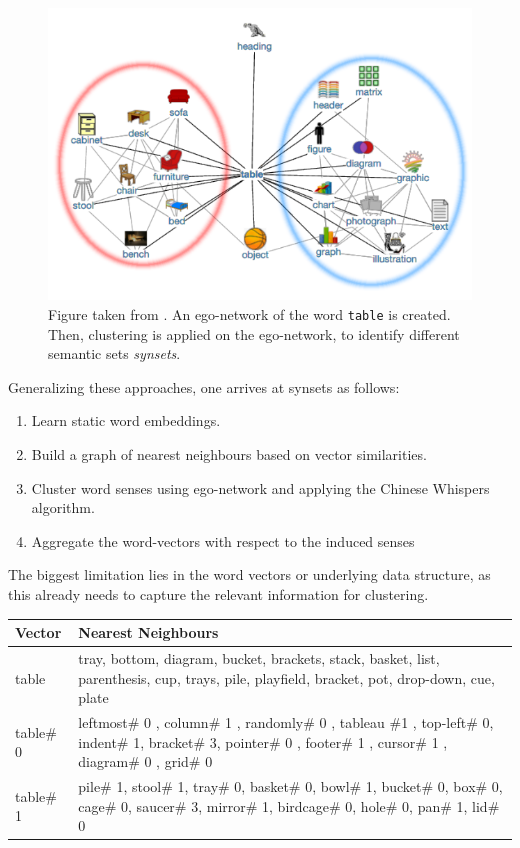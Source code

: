 \documentclass[a4paper,12pt,oneside,openright]{report}
\begin{document}
\begin{figure}[h]
	\center
  \includegraphics[width=0.6\linewidth]{./assets/relatedwork/ego_network.png}
  \caption{Figure taken from \cite{pelevina16}. An ego-network of the word \texttt{table} is created. Then, clustering is applied on the ego-network, to identify different semantic sets \textit{synsets}.}
  \label{fig:ego_network}
\end{figure}

Generalizing these approaches, one arrives at synsets as follows: 

\begin{enumerate}
\item Learn static word embeddings.
\item Build a graph of nearest neighbours based on vector similarities.
\item Cluster word senses using ego-network and applying the Chinese Whispers algorithm.
\item Aggregate the word-vectors with respect to the induced senses
\end{enumerate}

The biggest limitation lies in the word vectors or underlying data structure, as this already needs to capture the relevant information for clustering. \\

\begin{table}[H]
    \centering
    \begin{tabularx}{\textwidth}{p{50pt}|b}
    \toprule
      {\textbf{Vector}} & {\textbf{Nearest Neighbours}}  \\ \midrule
        table & tray, bottom, diagram, bucket, brackets, stack, basket, list, parenthesis, cup, trays, pile, playfield, bracket, pot, drop-down, cue, plate \\ \hline
        table\# 0 & leftmost\# 0 , column\# 1 , randomly\# 0 , tableau \#1 , top-left\# 0, indent\# 1, bracket\# 3, pointer\# 0 , footer\# 1 , cursor\# 1 , diagram\# 0 , grid\# 0      \\ \hline
        table\# 1 & pile\# 1, stool\# 1, tray\# 0, basket\# 0, bowl\# 1, bucket\# 0, box\# 0, cage\# 0, saucer\# 3, mirror\# 1, birdcage\# 0, hole\# 0, pan\# 1, lid\# 0    \\ \hline
    \end{tabularx}
\end{table}
\end{document}
